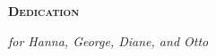 \newpage 
{}
{}
\begin{flushleft}
	\Huge \textsc{\textbf{Dedication}}

\end{flushleft}
\vspace*{8cm}
\begin{flushright}
   \emph{for Hanna, George, Diane, and Otto}
\end{flushright}
 
